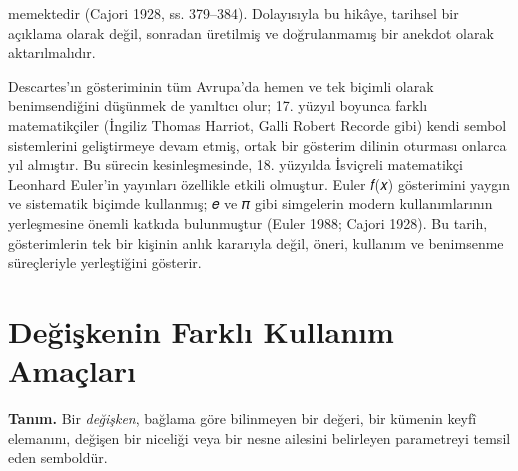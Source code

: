 memektedir (Cajori 1928, ss. 379–384). Dolayısıyla bu hikâye, tarihsel bir açıklama olarak değil, sonradan üretilmiş ve doğrulanmamış bir anekdot olarak aktarılmalıdır.

Descartes’ın gösteriminin tüm Avrupa’da hemen ve tek biçimli olarak benimsendiğini düşünmek de yanıltıcı olur; 17. yüzyıl boyunca farklı matematikçiler (İngiliz Thomas Harriot, Galli Robert Recorde gibi) kendi sembol sistemlerini geliştirmeye devam etmiş, ortak bir gösterim dilinin oturması onlarca yıl almıştır. Bu sürecin kesinleşmesinde, 18. yüzyılda İsviçreli matematikçi Leonhard Euler’in yayınları özellikle etkili olmuştur. Euler 𝑓(𝑥) gösterimini yaygın ve sistematik biçimde kullanmış; 𝑒 ve 𝜋 gibi simgelerin modern kullanımlarının yerleşmesine önemli katkıda bulunmuştur (Euler 1988; Cajori 1928). Bu tarih, gösterimlerin tek bir kişinin anlık kararıyla değil, öneri, kullanım ve benimsenme süreçleriyle yerleştiğini gösterir.

\section{Değişkenin Farklı Kullanım Amaçları}

\begin{tcolorbox}[bookbox,colback=cDef]
\textbf{\textsf{\textcolor{cAcc}{Tanım.}}}\quad
Bir \emph{değişken}, bağlama göre bilinmeyen bir değeri, bir kümenin keyfî elemanını, değişen bir niceliği veya bir nesne ailesini belirleyen parametreyi temsil eden semboldür.
\end{tcolorbox}

